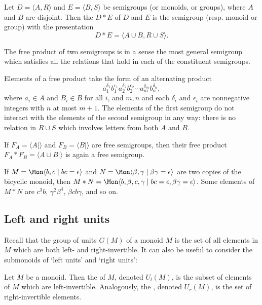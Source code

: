 \documentclass[noindex,noinsetproof,12pt]{lmaths}
\begin{document}
\begin{defn}
Let $D = \langle A, R \rangle$ and $E = \langle B, S \rangle$ be semigroups (or monoids, or groups), where $A$ and $B$ are disjoint. Then the  $D \ast E$ of $D$ and $E$ is the semigroup (resp. monoid or group) with the presentation
	\[ D \ast E = \langle A \cup B, R \cup S \rangle. \]
\end{defn}

The free product of two semigroups is in a sense the most general semigroup which satisfies all the relations that hold in each of the constituent semigroups.

Elements of a free product take the form of an alternating product
	\[ a_1^{\delta_1} b_1^{\epsilon_1} a_2^{\delta_2} b_2^{\epsilon_2} \cdots a_m^{\delta_m} b_n^{\delta_n}, \]
where $a_i \in A$ and $B_i \in B$ for all $i$, and $m, n$ and each $\delta_i$ and $\epsilon_i$ are nonnegative integers with $n$ at most $m + 1$. The elements of the first semigroup do not interact with the elements of the second semigroup in any way: there is no relation in $R \cup S$ which involves letters from both $A$ and $B$.

\begin{example}
	If $F_A = \langle A \mid \rangle$ and $F_B = \langle B \mid \rangle$ are free semigroups, then their free product $F_A \ast F_B = \langle A \cup B \mid \rangle$ is again a free semigroup.
\end{example}

\begin{example}
	If $M = \Mon \langle b, c \mid bc = \epsilon \rangle$ and $N = \Mon \langle \beta, \gamma \mid \beta\gamma = \epsilon \rangle$ are two copies of the bicyclic monoid, then $M \ast N = \Mon \langle b, \beta, c, \gamma \mid bc = \epsilon, \beta\gamma = \epsilon \rangle$. Some elements of $M \ast N$ are $c^3 b$, $\gamma^2\beta^4$, $\beta c b \gamma$, and so on.
\end{example}


\subsection{Left and right units}

Recall that the group of units $G(M)$ of a monoid $M$ is the set of all elements in $M$ which are both left- and right-invertible. It can also be useful to consider the submonoids of `left units' and `right units':

\begin{defn}
	Let $M$ be a monoid. Then the  of $M$, denoted $U_l(M)$, is the subset of elements of $M$ which are left-invertible. Analogously, the , denoted $U_r(M)$, is the set of right-invertible elements.
\end{defn}
\end{document}
